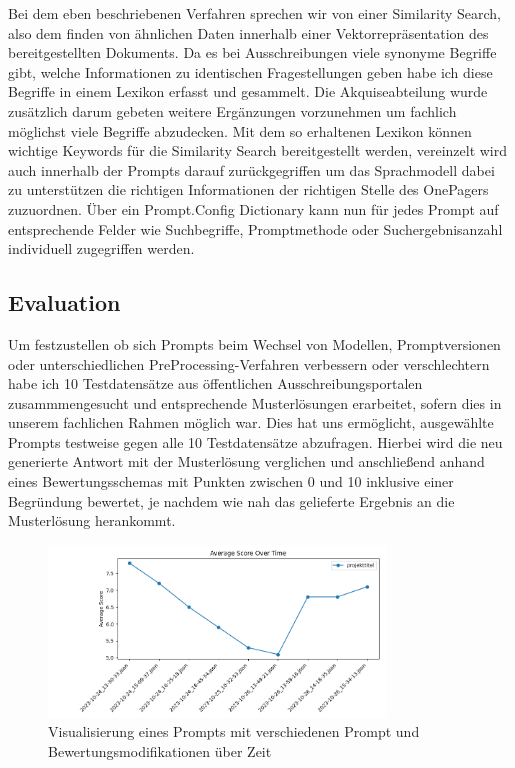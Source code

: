 Bei dem eben beschriebenen Verfahren sprechen wir von einer Similarity Search, also dem finden von ähnlichen Daten innerhalb einer Vektorrepräsentation des 
bereitgestellten Dokuments. Da es bei Ausschreibungen viele synonyme Begriffe gibt, welche Informationen zu identischen Fragestellungen geben habe ich diese 
Begriffe in einem Lexikon erfasst und gesammelt. Die Akquiseabteilung wurde zusätzlich darum gebeten weitere Ergänzungen vorzunehmen um fachlich möglichst 
viele Begriffe abzudecken. Mit dem so erhaltenen Lexikon können wichtige Keywords für die Similarity Search bereitgestellt werden, vereinzelt wird auch innerhalb 
der Prompts darauf zurückgegriffen um das Sprachmodell dabei zu unterstützen die richtigen Informationen der richtigen Stelle des OnePagers zuzuordnen. Über ein 
Prompt.Config Dictionary kann nun für jedes Prompt auf entsprechende Felder wie Suchbegriffe, Promptmethode oder Suchergebnisanzahl individuell zugegriffen werden.

\subsection{Evaluation} 
\label{chap:Evaluation}   
Um festzustellen ob sich Prompts beim Wechsel von Modellen, Promptversionen oder unterschiedlichen PreProcessing-Verfahren verbessern oder verschlechtern 
habe ich 10 Testdatensätze aus öffentlichen Ausschreibungsportalen zusammmengesucht und entsprechende Musterlösungen erarbeitet, sofern dies in unserem 
fachlichen Rahmen möglich war. Dies hat uns ermöglicht, ausgewählte Prompts testweise gegen alle 10 Testdatensätze abzufragen. Hierbei wird die neu 
generierte Antwort mit der Musterlösung verglichen und anschließend anhand eines Bewertungsschemas mit Punkten zwischen 0 und 10 inklusive einer 
Begründung bewertet, je nachdem wie nah das gelieferte Ergebnis an die Musterlösung herankommt.    

\begin{figure}[h]
    \centering
    \includegraphics[width=0.8\textwidth]{figures/02_Prompt_Evaluierung.png}
    \caption{Visualisierung eines Prompts mit verschiedenen Prompt und Bewertungsmodifikationen über Zeit}
    \label{figure:02_Prompt_Evaluierung}     %
\end{figure}

